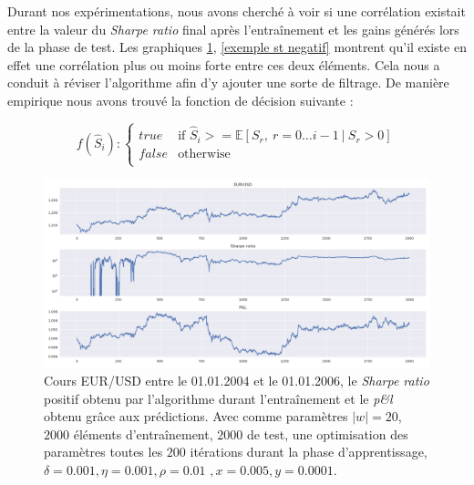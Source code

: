 \documentclass[a4paper, 11pt]{article}
\begin{document}
Durant nos expérimentations, nous avons cherché à voir si une corrélation existait entre la valeur du \textit{Sharpe ratio} final après l'entraînement et les gains générés lors de la phase de test. Les graphiques \ref{exemple st positif}, \ref{exemple st negatif} montrent qu'il existe en effet une corrélation plus ou moins forte entre ces deux éléments. Cela nous a conduit à réviser l'algorithme afin d'y ajouter une sorte de filtrage. De manière empirique nous avons trouvé la fonction de décision suivante :

\begin{displaymath}
f(\widehat{S}_i):
\left \{
\begin{array}{rl}
true & \text{if\ \ } \widehat{S}_i >= \mathbb{E}[{S_r,\ r=0\dots i-1\ |\ S_r > 0}]\\
false & \text{otherwise} \\
\end{array}
\right.
\end{displaymath}

\begin{figure}
	\centering
	\includegraphics[scale=0.5]{res/Exemple_St_positif}
	\caption[Blup]{Cours EUR/USD entre le 01.01.2004 et le 01.01.2006, le \textit{Sharpe ratio} positif obtenu par l'algorithme durant l'entraînement et le \textit{p\&l} obtenu grâce aux prédictions. Avec comme paramètres $|w| = 20$, $2000$ éléments d'entraînement, $2000$ de test, une optimisation des
		paramètres toutes les $200$ itérations durant la phase d'apprentissage, $\delta = 0.001, \eta=0.001,\rho=0.01$
		\footnotemark$, x = 0.005, y=0.0001$. }
	\label{exemple st positif}
\end{figure}
\end{document}
